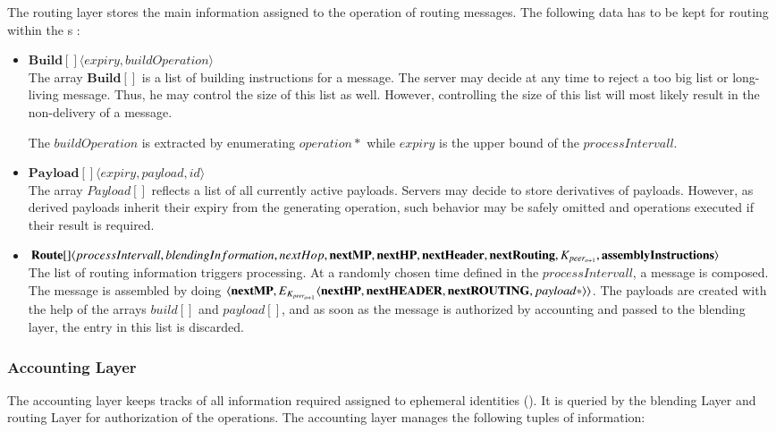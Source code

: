 The routing layer stores the main information assigned to the operation of routing messages. The following data has to be kept for routing within the s :
\begin{itemize}
	\item $\mathbf{Build[]}\langle expiry, buildOperation \rangle$\\
	The array $\mathbf{Build[]}$ is a list of building instructions for a message. The server may decide at any time to reject a too big list or long-living message. Thus, he may control the size of this list as well. However, controlling the size of this list will most likely result in the non-delivery of a message. 
	
	The $buildOperation$ is extracted by enumerating $operation*$ while $expiry$ is the upper bound of the $processIntervall$.
	\item $\mathbf{Payload[]}\langle expiry, payload, id \rangle$\\
	The array $Payload[]$ reflects a list of all currently active payloads. Servers may decide to store derivatives of payloads. However, as derived payloads inherit their expiry from the generating operation, such behavior may be safely omitted and operations executed if their result is required.
	
	\item $\splitatcommas{\mathbf{Route[]}\langle processIntervall, blendingInformation, nextHop, \mathbf{nextMP}, \mathbf {nextHP}, \mathbf{nextHeader}, \mathbf{nextRouting}, K_{peer_{o+1}}, \mathbf{assemblyInstructions} \rangle}$\\
	The list of routing information triggers processing. At a randomly chosen time defined in the $processIntervall$, a message is composed. The message is assembled by doing $\splitatcommas{\langle \mathbf{nextMP}, E_{K_{peer_{o+1}}}\langle \mathbf{nextHP}, \mathbf{nextHEADER}, \mathbf{nextROUTING}, payload* \rangle \rangle}$. The payloads are created with the help of the arrays $build[]$ and $payload[]$, and as soon as the message is authorized by accounting and passed to the blending layer, the entry in this list is discarded.
\end{itemize}

\subsubsection{Accounting Layer\label{sec:accountingLayer}}
The accounting layer keeps tracks of all information required assigned to ephemeral identities (). It is queried by the blending Layer and routing Layer for authorization of the operations. The accounting layer manages the following tuples of information:

